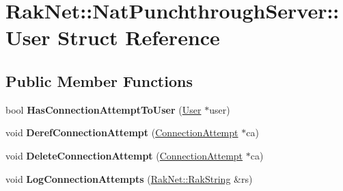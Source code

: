 \hypertarget{struct_rak_net_1_1_nat_punchthrough_server_1_1_user}{\section{Rak\-Net\-:\-:Nat\-Punchthrough\-Server\-:\-:User Struct Reference}
\label{struct_rak_net_1_1_nat_punchthrough_server_1_1_user}
}
\subsection*{Public Member Functions}
\begin{DoxyCompactItemize}
\item 
\hypertarget{struct_rak_net_1_1_nat_punchthrough_server_1_1_user_a351b85f892b5a88f9be04e59c980e13a}{bool {\bfseries Has\-Connection\-Attempt\-To\-User} (\hyperlink{struct_rak_net_1_1_nat_punchthrough_server_1_1_user}{User} $\ast$user)}\label{struct_rak_net_1_1_nat_punchthrough_server_1_1_user_a351b85f892b5a88f9be04e59c980e13a}

\item 
\hypertarget{struct_rak_net_1_1_nat_punchthrough_server_1_1_user_a697b38016eec1be037543a6d75c65f68}{void {\bfseries Deref\-Connection\-Attempt} (\hyperlink{struct_rak_net_1_1_nat_punchthrough_server_1_1_connection_attempt}{Connection\-Attempt} $\ast$ca)}\label{struct_rak_net_1_1_nat_punchthrough_server_1_1_user_a697b38016eec1be037543a6d75c65f68}

\item 
\hypertarget{struct_rak_net_1_1_nat_punchthrough_server_1_1_user_af7c92e1fb47a05cbbe3416148f8b64da}{void {\bfseries Delete\-Connection\-Attempt} (\hyperlink{struct_rak_net_1_1_nat_punchthrough_server_1_1_connection_attempt}{Connection\-Attempt} $\ast$ca)}\label{struct_rak_net_1_1_nat_punchthrough_server_1_1_user_af7c92e1fb47a05cbbe3416148f8b64da}

\item 
\hypertarget{struct_rak_net_1_1_nat_punchthrough_server_1_1_user_a3d523a2ab6bb6a5a7f4d95443db34f0a}{void {\bfseries Log\-Connection\-Attempts} (\hyperlink{class_rak_net_1_1_rak_string}{Rak\-Net\-::\-Rak\-String} \&rs)}\label{struct_rak_net_1_1_nat_punchthrough_server_1_1_user_a3d523a2ab6bb6a5a7f4d95443db34f0a}

\end{DoxyCompactItemize}
